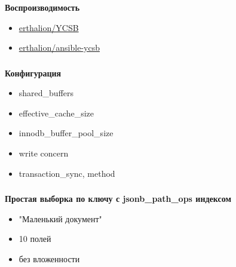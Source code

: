 \documentclass[18pt, compress, aspectratio=169]{beamer}
\begin{document}
\begin{frame}
    \frametitle{}
    \begin{center}
        \textbf{Воспроизводимость}
        \begin{itemize}[label={}]
            \item \href{https://github.com/erthalion/YCSB}{erthalion/YCSB}
            \item \href{https://github.com/erthalion/ansible-ycsb}{erthalion/ansible-ycsb}
        \end{itemize}
    \end{center}
\end{frame}

\begin{frame}
    \frametitle{}
    \begin{center}
        \textbf{Конфигурация}
        \begin{itemize}[label={}]
            \item shared\_buffers
            \item effective\_cache\_size
            \item innodb\_buffer\_pool\_size
            \item write concern
            \item transaction\_sync, method
        \end{itemize}
    \end{center}
\end{frame}

\begin{frame}
    \frametitle{}
    \begin{center}
        \textbf{Простая выборка по ключу с jsonb\_path\_ops индексом}
        \begin{itemize}[label={}]
            \item "Маленький документ"
            \item 10 полей
            \item без вложенности
        \end{itemize}
    \end{center}
\end{frame}
\end{document}
